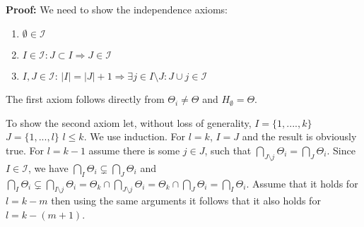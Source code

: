 \documentclass[a4paper,12pt]{article}
\newenvironment{proof}[1][Proof]{\noindent\textbf{#1:} }{}
\begin{document}
\begin{proof}
  We need to show the independence axioms:
  \begin{enumerate}
  \item $\emptyset \in \mathscr{I}$
  \item $I  \in \mathscr{I}: J \subset I \Rightarrow J \in \mathscr{I}$
  \item $I,J \in \mathscr{I}$: $|I|=|J|+1 \Rightarrow \exists j \in
    I\setminus J: J \cup j \in \mathscr{I}$ 
  \end{enumerate}
  The first axiom follows directly from $\Theta_i \neq \Theta$ and
  $H_\emptyset = \Theta$. 

  To show the second axiom let, without loss of generality, $I =
  \{1,....,k\}$ $J = \{1,...,l\}$ $l \leq k$. We use induction. For $l
  = k$, $I = J$ and the result is obviously true. For $l = k-1$ assume
  there is some $j \in J$, such that $\bigcap_{J \setminus j} \Theta_i
  = \bigcap_{J} \Theta_i$. Since $I \in \mathscr{I}$, we have
  $\bigcap_{I} \Theta_i \subsetneq \bigcap_{J} \Theta_i$ and
  $\bigcap_I \Theta_i \subsetneq \bigcap_{I \setminus j} \Theta_i =
  \Theta_k \cap \bigcap_{J \setminus j} \Theta_i= \Theta_k \cap \bigcap_{J}
  \Theta_i= \bigcap_I \Theta_i$. Assume that it holds for $l = k - m$
  then using the same arguments it follows that it also holds for $l =
  k - (m + 1)$.


\end{proof}
\end{document}
